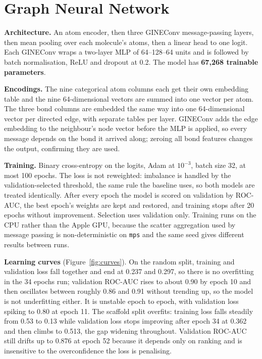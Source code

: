 \documentclass[10pt,a4paper]{article}
\begin{document}
\section{Graph Neural Network}
\textbf{Architecture.} An atom encoder, then three GINEConv message-passing layers, then mean pooling over each molecule's atoms, then a linear head to one logit. Each GINEConv wraps a two-layer MLP of 64--128--64 units and is followed by batch normalisation, ReLU and dropout at 0.2. The model has \textbf{67{,}268 trainable parameters}.

\textbf{Encodings.} The nine categorical atom columns each get their own embedding table and the nine 64-dimensional vectors are summed into one vector per atom. The three bond columns are embedded the same way into one 64-dimensional vector per directed edge, with separate tables per layer. GINEConv adds the edge embedding to the neighbour's node vector before the MLP is applied, so every message depends on the bond it arrived along; zeroing all bond features changes the output, confirming they are used.

\textbf{Training.} Binary cross-entropy on the logits, Adam at $10^{-3}$, batch size 32, at most 100 epochs. The loss is not reweighted: imbalance is handled by the validation-selected threshold, the same rule the baseline uses, so both models are treated identically. After every epoch the model is scored on validation by ROC-AUC, the best epoch's weights are kept and restored, and training stops after 20 epochs without improvement. Selection uses validation only. Training runs on the CPU rather than the Apple GPU, because the scatter aggregation used by message passing is non-deterministic on \texttt{mps} and the same seed gives different results between runs.

\textbf{Learning curves} (Figure~\ref{fig:curves}). On the random split, training and validation loss fall together and end at 0.237 and 0.297, so there is no overfitting in the 34 epochs run; validation ROC-AUC rises to about 0.90 by epoch 10 and then oscillates between roughly 0.86 and 0.91 without trending up, so the model is not underfitting either. It is unstable epoch to epoch, with validation loss spiking to 0.80 at epoch 11. The scaffold split overfits: training loss falls steadily from 0.53 to 0.13 while validation loss stops improving after epoch 34 at 0.362 and then climbs to 0.513, the gap widening throughout. Validation ROC-AUC still drifts up to 0.876 at epoch 52 because it depends only on ranking and is insensitive to the overconfidence the loss is penalising.
\end{document}
